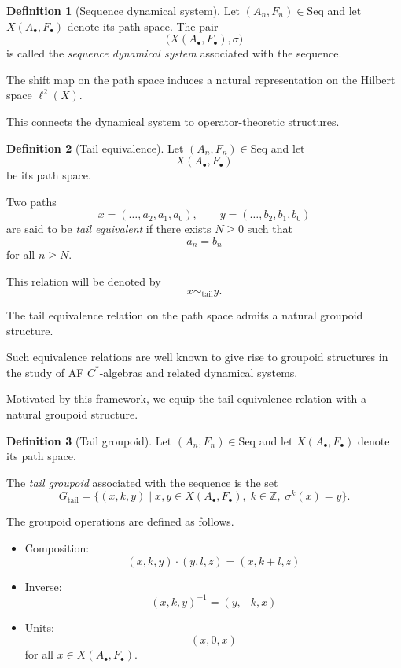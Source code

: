 \documentclass[11pt]{book}
\theoremstyle{definition}
\newtheorem{definition}{Definition}[section]
\theoremstyle{plain}
\theoremstyle{remark}
\begin{document}
\begin{definition}[Sequence dynamical system]
Let $(A_n,F_n)\in \mathrm{Seq}$ and let
$X(A_\bullet,F_\bullet)$ denote its path space.
The pair
\[
\bigl(X(A_\bullet,F_\bullet),\sigma\bigr)
\]
is called the \emph{sequence dynamical system} associated with the
sequence.
\end{definition}

The shift map on the path space
induces a natural representation on the Hilbert space $\ell^2(X)$.

This connects the dynamical system
to operator-theoretic structures.

\begin{definition}[Tail equivalence]
Let $(A_n,F_n) \in \mathrm{Seq}$ and let
\[
X(A_\bullet,F_\bullet)
\]
be its path space.

Two paths
\[
x=(\ldots,a_2,a_1,a_0),
\qquad
y=(\ldots,b_2,b_1,b_0)
\]
are said to be \emph{tail equivalent} if there exists
$N \ge 0$ such that
\[
a_n = b_n
\]
for all $n \ge N$.

This relation will be denoted by
\[
x \sim_{\mathrm{tail}} y .
\]
\end{definition}

The tail equivalence relation on the path space admits
a natural groupoid structure.

Such equivalence relations are well known
to give rise to groupoid structures
in the study of AF $C^*$-algebras and related dynamical systems.

Motivated by this framework,
we equip the tail equivalence relation with a natural groupoid structure.

\begin{definition}[Tail groupoid]
Let $(A_n,F_n)\in \mathrm{Seq}$ and let
$X(A_\bullet,F_\bullet)$ denote its path space.

The \emph{tail groupoid} associated with the sequence
is the set
\[
G_{\mathrm{tail}}
=
\{(x,k,y) \mid x,y\in X(A_\bullet,F_\bullet),\;
k\in \mathbb{Z},\;
\sigma^k(x)=y \}.
\]

The groupoid operations are defined as follows.

\begin{itemize}
\item
Composition:
\[
(x,k,y)\cdot(y,l,z)=(x,k+l,z)
\]

\item
Inverse:
\[
(x,k,y)^{-1}=(y,-k,x)
\]

\item
Units:
\[
(x,0,x)
\]
for all $x\in X(A_\bullet,F_\bullet)$.
\end{itemize}
\end{definition}
\end{document}
